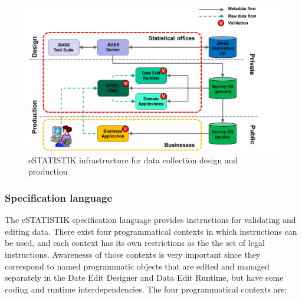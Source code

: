 \begin{figure}[!ht]
\begin{center}
\includegraphics[scale=0.5]{fig/estatinfra.png} 
\end{center}
\caption{eSTATISTIK infrastructure for data collection design and production}
\label{estatinfra}
\end{figure}

\subsubsection{Specification language}

The eSTATISTIK specification language provides instructions for validating and editing data. There exist four programmatical contexts in which instructions can be used, and each context has its own restrictions as the the set of legal instructions. Awarenesss of those contexts is very important since they correspond to named programmatic objects that are edited and managed separately in the Date Edit Designer and Data Edit Runtime, but have some coding and runtime interdependencies. The four programmatical contexts are:

